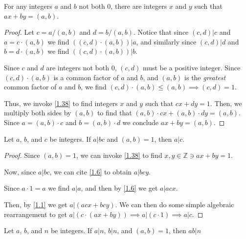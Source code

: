 \documentclass[../main.tex]{subfiles}
\begin{document}
\begin{thm} \label{1.40}
  For any integers $a$ and $b$ not both $0$, there are integers $x$ and $y$ such that $ax + by = (a, b)$.
\end{thm}

\begin{proof}
  Let $c = a / (a, b)$ and $d = b / (a, b)$. Notice that since $(c, d) | c$ and $a = c \cdot (a, b)$ we find $\left( (c, d) \cdot (a, b) \right) | a$, and similarly since $(c, d) | d$ and $b = d \cdot (a, b)$ we find $\left( (c, d) \cdot (a, b) \right) | b$.

  Since $c$ and $d$ are integers not both $0$, $(c, d)$ must be a positive integer. Since $(c, d) \cdot (a, b)$ is a common factor of $a$ and $b$, and $(a, b)$ is the \emph{greatest} common factor of $a$ and $b$, we find $(c, d) \cdot (a, b) \leq (a, b) \implies (c, d) = 1$.

  Thus, we invoke \ref{1.38} to find integers $x$ and $y$ such that $cx + dy = 1$. Then, we multiply both sides by $(a, b)$ to find that $(a, b) \cdot cx + (a, b) \cdot dy = (a, b)$. Since $a = (a, b) \cdot c$ and $b = (a, b) \cdot d$ we conclude $ax + by = (a, b)$.
\end{proof}



\pagebreak



\begin{thm} \label{1.41}
  Let $a$, $b$, and $c$ be integers. If $a|bc$ and $(a, b) = 1$, then $a|c$.
\end{thm}

\begin{proof}
  Since $(a, b) = 1$, we can invoke \ref{1.38} to find $x, y \in \mathbb{Z} \ni ax + by = 1$.

  Now, since $a | bc$, we can cite \ref{1.6} to obtain $a | bcy$.

  Since $a \cdot 1 = a$ we find $a | a$, and then by \ref{1.6} we get $a | acx$.

  Then, by \ref{1.1} we get $a | (acx + bcy)$. We can then do some simple algebraic rearrangement to get $a | \left( c \cdot (ax + by) \right) \implies a | (c \cdot 1) \implies a | c$.
\end{proof}



\begin{thm} \label{1.42}
  Let $a$, $b$, and $n$ be integers. If $a|n$, $b|n$, and $(a, b) = 1$, then $ab | n$
\end{thm}
\end{document}
